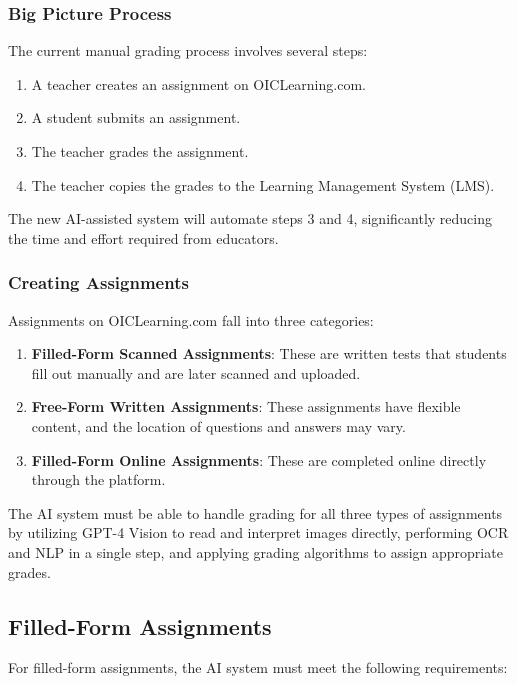 \documentclass[ms,twoside,print]{nuthesis}
\begin{document}
\subsubsection{Big Picture Process}

The current manual grading process involves several steps:

\begin{enumerate}
    \item A teacher creates an assignment on OICLearning.com.
    \item A student submits an assignment.
    \item The teacher grades the assignment.
    \item The teacher copies the grades to the Learning Management System (LMS).
\end{enumerate}

The new AI-assisted system will automate steps 3 and 4, significantly reducing the time and effort required from educators.

\subsubsection{Creating Assignments}

Assignments on OICLearning.com fall into three categories:

\begin{enumerate}
    \item \textbf{Filled-Form Scanned Assignments}: These are written tests that students fill out manually and are later scanned and uploaded.
    \item \textbf{Free-Form Written Assignments}: These assignments have flexible content, and the location of questions and answers may vary.
    \item \textbf{Filled-Form Online Assignments}: These are completed online directly through the platform.
\end{enumerate}

The AI system must be able to handle grading for all three types of assignments by utilizing GPT-4 Vision to read and interpret images directly, performing OCR and NLP in a single step, and applying grading algorithms to assign appropriate grades.

\subsection{Filled-Form Assignments}

For filled-form assignments, the AI system must meet the following requirements:
\end{document}
